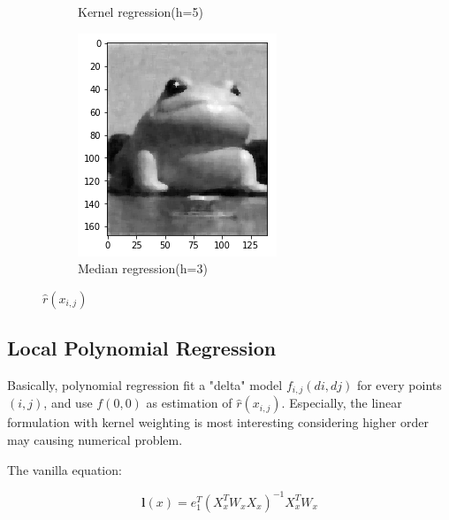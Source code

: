 \documentclass{article}
\begin{document}
\begin{figure}[htb]
\begin{subfigure}[b]{0.24\linewidth}
    \caption{Kernel regression(h=5)}
  \end{subfigure}
  \begin{subfigure}[b]{0.24\linewidth}
    \includegraphics[width=\linewidth]{images/noise_removal_4.png}
    \caption{Median regression(h=3)}
  \end{subfigure}
  \caption{$\hat{r}(x_{i,j})$}
  \label{fig:effect_noise_removal}
\end{figure}


\subsection{Local Polynomial Regression}

Basically, polynomial regression fit a "delta" model $f_{i,j}(di,dj)$ for every points $(i,j)$, and use $f(0,0)$
as estimation of $\hat{r}(x_{i,j})$. Especially, the linear formulation with kernel weighting is most 
interesting considering higher order may causing numerical problem.

The vanilla equation:

$$
\mathbf{l}(x) = e_1^T (X_x^T W_x X_x)^{-1} X_x^T W_x
$$
\end{document}
